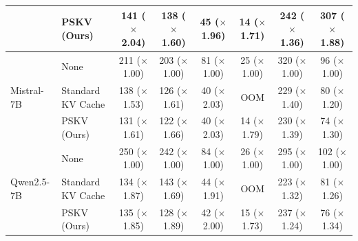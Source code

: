 \begin{table}[t]
\begin{tabular}{l l c c c c c c}
& PSKV (Ours) & 141 \scriptsize($\times$ 2.04)& 138 \scriptsize($\times$ 1.60)& 45 \scriptsize($\times$ 1.96)& 14 \scriptsize($\times$ 1.71)& 242 \scriptsize($\times$ 1.36)& 307 \scriptsize($\times$ 1.88)\\
\midrule
\multirow{3}{*}{Mistral-7B} 
& None & 211 \scriptsize($\times$ 1.00)& 203 \scriptsize($\times$ 1.00)& 81 \scriptsize($\times$ 1.00)& 25 \scriptsize($\times$ 1.00)& 320 \scriptsize($\times$ 1.00)& 96 \scriptsize($\times$ 1.00)\\
& Standard KV Cache & 138 \scriptsize($\times$ 1.53)& 126 \scriptsize($\times$ 1.61)& 40 \scriptsize($\times$ 2.03)& OOM& 229 \scriptsize($\times$ 1.40)& 80 \scriptsize($\times$ 1.20)\\
& PSKV (Ours) & 131 \scriptsize($\times$ 1.61)& 122 \scriptsize($\times$ 1.66)& 40 \scriptsize($\times$ 2.03)& 14 \scriptsize($\times$ 1.79)& 230 \scriptsize($\times$ 1.39)& 74 \scriptsize($\times$ 1.30)\\
\midrule
\multirow{3}{*}{Qwen2.5-7B} 
& None & 250 \scriptsize($\times$ 1.00)& 242 \scriptsize($\times$ 1.00)& 84 \scriptsize($\times$ 1.00)& 26 \scriptsize($\times$ 1.00)& 295 \scriptsize($\times$ 1.00)& 102 \scriptsize($\times$ 1.00)\\
& Standard KV Cache & 134 \scriptsize($\times$ 1.87)& 143 \scriptsize($\times$ 1.69)& 44 \scriptsize($\times$ 1.91)& OOM& 223 \scriptsize($\times$ 1.32)& 81 \scriptsize($\times$ 1.26)\\
& PSKV (Ours) & 135 \scriptsize($\times$ 1.85)& 128 \scriptsize($\times$ 1.89)& 42 \scriptsize($\times$ 2.00)& 15 \scriptsize($\times$ 1.73)& 237 \scriptsize($\times$ 1.24)& 76 \scriptsize($\times$ 1.34)\\
\bottomrule
\end{tabular}%
\end{table}